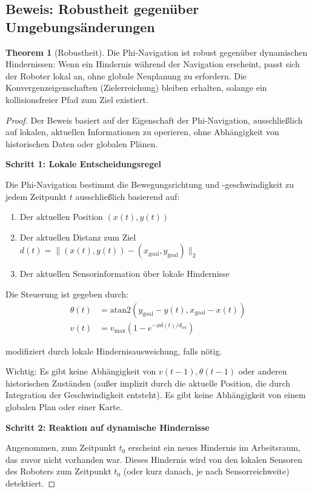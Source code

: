 ﻿\documentclass[a4paper,12pt]{article}
\theoremstyle{definition}
\newtheorem{theorem}{Theorem}[section]
\begin{document}
\subsection{Beweis: Robustheit gegenüber Umgebungsänderungen}

\begin{theorem}[Robustheit]
Die Phi-Navigation ist robust gegenüber dynamischen Hindernissen: Wenn ein Hindernis während der Navigation erscheint, passt sich der Roboter lokal an, ohne globale Neuplanung zu erfordern. Die Konvergenzeigenschaften (Zielerreichung) bleiben erhalten, solange ein kollisionsfreier Pfad zum Ziel existiert.
\end{theorem}

\begin{proof}
Der Beweis basiert auf der Eigenschaft der Phi-Navigation, ausschließlich auf lokalen, aktuellen Informationen zu operieren, ohne Abhängigkeit von historischen Daten oder globalen Plänen.

\textbf{Schritt 1: Lokale Entscheidungsregel}

Die Phi-Navigation bestimmt die Bewegungsrichtung und -geschwindigkeit zu jedem Zeitpunkt $t$ ausschließlich basierend auf:
\begin{enumerate}
\item Der aktuellen Position $(x(t), y(t))$
\item Der aktuellen Distanz zum Ziel $d(t) = \|(x(t), y(t)) - (x_{\text{goal}}, y_{\text{goal}})\|_2$
\item Der aktuellen Sensorinformation über lokale Hindernisse
\end{enumerate}

Die Steuerung ist gegeben durch:
\begin{align}
\theta(t) &= \text{atan2}(y_{\text{goal}} - y(t), x_{\text{goal}} - x(t)) \\
v(t) &= v_{\max}(1 - e^{-\phi d(t)/d_{\text{ref}}})
\end{align}

modifiziert durch lokale Hindernisausweichung, falls nötig.

Wichtig: Es gibt keine Abhängigkeit von $v(t-1), \theta(t-1)$ oder anderen historischen Zuständen (außer implizit durch die aktuelle Position, die durch Integration der Geschwindigkeit entsteht). Es gibt keine Abhängigkeit von einem globalen Plan oder einer Karte.

\textbf{Schritt 2: Reaktion auf dynamische Hindernisse}

Angenommen, zum Zeitpunkt $t_0$ erscheint ein neues Hindernis im Arbeitsraum, das zuvor nicht vorhanden war. Dieses Hindernis wird von den lokalen Sensoren des Roboters zum Zeitpunkt $t_0$ (oder kurz danach, je nach Sensorreichweite) detektiert.


\end{proof}
\end{document}
